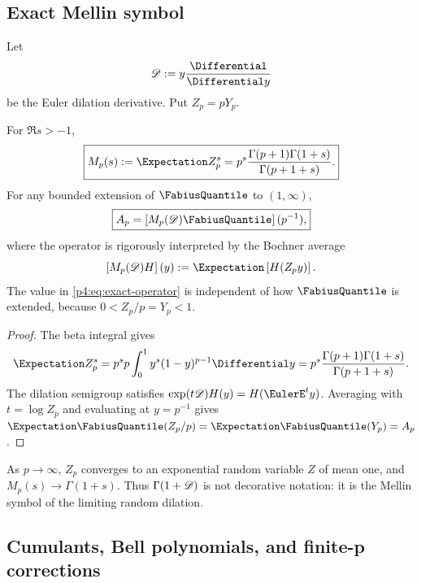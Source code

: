 \documentclass[11pt,oneside]{article}
\theoremstyle{definition}
\theoremstyle{remark}
\begin{document}
\subsection{Exact Mellin symbol}

Let
\begin{equation}
 \Dop:=y\frac{\Differential}{\Differential y}
 \label{p4:eq:Euler-operator}
\end{equation}
be the Euler dilation derivative.  Put $Z_p=pY_p$.

\begin{proposition}
\label{p4:prop:Mellin-symbol}
For $\Re s>-1$,
\begin{equation}
 \boxed{
 M_p(s):=\Expectation Z_p^s
 =p^s\frac{\Gamma(p+1)\Gamma(1+s)}{\Gamma(p+1+s)}.}
 \label{p4:eq:Mellin-symbol}
\end{equation}
For any bounded extension of $\FabiusQuantile$ to $(1,\infty)$,
\begin{equation}
 \boxed{
 A_p=\left[M_p(\Dop)\FabiusQuantile\right](p^{-1}),}
 \label{p4:eq:exact-operator}
\end{equation}
where the operator is rigorously interpreted by the Bochner average
\begin{equation}
 \left[M_p(\Dop)H\right](y)
 :=\Expectation\left[H(Z_py)\right].
 \label{p4:eq:Bochner-dilation}
\end{equation}
The value in \eqref{p4:eq:exact-operator} is independent of how
$\FabiusQuantile$ is extended, because
$0<Z_p/p=Y_p<1$.
\end{proposition}

\begin{proof}
The beta integral gives
\[
 \Expectation Z_p^s=p^s p\int_0^1y^s(1-y)^{p-1}\Differential y
 =p^s\frac{\Gamma(p+1)\Gamma(1+s)}{\Gamma(p+1+s)}.
\]
The dilation semigroup satisfies $\exp(t\Dop)H(y)=H(\EulerE^t y)$.  Averaging with
\(t=\log Z_p\) and evaluating at $y=p^{-1}$ gives
$\Expectation\FabiusQuantile(Z_p/p)
=\Expectation\FabiusQuantile(Y_p)=A_p$.
\end{proof}

As $p\to\infty$, $Z_p$ converges to an exponential random variable $Z$ of mean one, and
$M_p(s)\to\Gamma(1+s)$.  Thus $\Gamma(1+\mathscr D)$ is not decorative notation: it is the Mellin
symbol of the limiting random dilation.

\subsection{Cumulants, Bell polynomials, and finite-p corrections}
\end{document}
